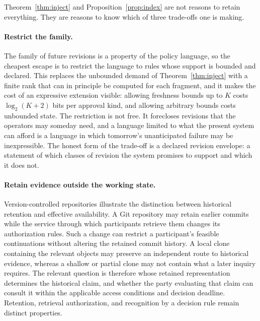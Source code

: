 \documentclass[11pt]{article}
\theoremstyle{definition}
\theoremstyle{remark}
\begin{document}
Theorem~\ref{thm:inject} and Proposition~\ref{prop:index} are not reasons to retain everything. They are reasons to know which of three trade-offs one is making.

\paragraph{Restrict the family.}
The family of future revisions is a property of the policy language, so the cheapest escape is to restrict the language to rules whose support is bounded and declared. This replaces the unbounded demand of Theorem~\ref{thm:inject} with a finite rank that can in principle be computed for each fragment, and it makes the cost of an expressive extension visible: allowing freshness bounds up to $K$ costs $\log_2(K+2)$ bits per approval kind, and allowing arbitrary bounds costs unbounded state. The restriction is not free. It forecloses revisions that the operators may someday need, and a language limited to what the present system can afford is a language in which tomorrow's unanticipated failure may be inexpressible. The honest form of the trade-off is a declared revision envelope: a statement of which classes of revision the system promises to support and which it does not.

\paragraph{Retain evidence outside the working state.}
Version-controlled repositories illustrate the distinction between historical retention and effective availability. A Git repository may retain earlier commits while the service through which participants retrieve them changes its authorization rules. Such a change can restrict a participant's feasible continuations without altering the retained commit history. A local clone containing the relevant objects may preserve an independent route to historical evidence, whereas a shallow or partial clone may not contain what a later inquiry requires. The relevant question is therefore whose retained representation determines the historical claim, and whether the party evaluating that claim can consult it within the applicable access conditions and decision deadline. Retention, retrieval authorization, and recognition by a decision rule remain distinct properties.
\end{document}
